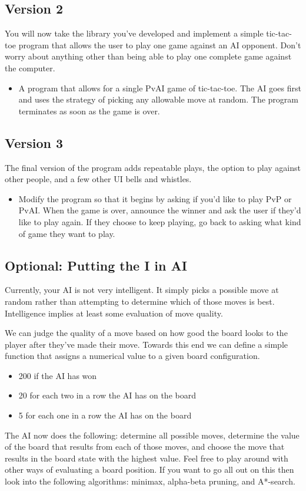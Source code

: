 \documentclass[]{tufte-handout}
\begin{document}
\subsection{Version 2}

You will now take the library you've developed and implement a simple tic-tac-toe
program that allows the user to play one game against an AI opponent. Don't worry
about anything other than being able to play one complete game against the
computer.

\begin{itemize}
  \item A program that allows for a single PvAI game of tic-tac-toe. The AI goes
  first and uses the strategy of picking any allowable move at random. The program
  terminates as soon as the game is over.
\end{itemize}

\subsection{Version 3}

The final version of the program adds repeatable plays, the option to play against
other people, and a few other UI bells and whistles.

\begin{itemize}
  \item Modify the program so that it begins by asking if you'd like to play PvP
  or PvAI. When the game is over, announce the winner and ask the user if they'd
  like to play again. If they choose to keep playing, go back to asking what kind
  of game they want to play.
\end{itemize}

\subsection{Optional: Putting the I in AI}

Currently, your AI is not very intelligent. It simply picks a possible move at random
rather than attempting to determine which of those moves is best. Intelligence
implies at least some evaluation of move quality.

We can judge the quality of a move based on how good the board looks to the player
after they've made their move. Towards this end we can define a simple function
that assigns a numerical value to a given board configuration.
\begin{itemize}
  \item 200 if the AI has won
  \item 20 for each two in a row the AI has on the board
  \item 5 for each one in a row the AI has on the board
\end{itemize}
The AI now does the following: determine all possible moves, determine the value
of the board that results from each of those moves, and choose the move that
results in the board state with the highest value. Feel free to play around with
other ways of evaluating a board position. If you want to go all out on this then
look into the following algorithms: minimax, alpha-beta pruning, and A*-search.
\end{document}
